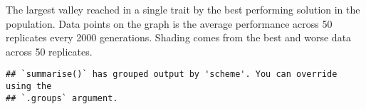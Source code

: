 \documentclass[]{book}
\newenvironment{Shaded}{\begin{snugshade}}{\end{snugshade}}
\newcommand{\DataTypeTok}[1]{\textcolor[rgb]{0.13,0.29,0.53}{#1}}
\newcommand{\KeywordTok}[1]{\textcolor[rgb]{0.13,0.29,0.53}{\textbf{#1}}}
\newcommand{\NormalTok}[1]{#1}
\newcommand{\OperatorTok}[1]{\textcolor[rgb]{0.81,0.36,0.00}{\textbf{#1}}}
\newcommand{\StringTok}[1]{\textcolor[rgb]{0.31,0.60,0.02}{#1}}
\begin{document}
The largest valley reached in a single trait by the best performing solution in the population.
Data points on the graph is the average performance across 50 replicates every 2000 generations.
Shading comes from the best and worse data across 50 replicates.

\begin{Shaded}
\end{Shaded}

\begin{verbatim}
## `summarise()` has grouped output by 'scheme'. You can override using the
## `.groups` argument.
\end{verbatim}
\end{document}

